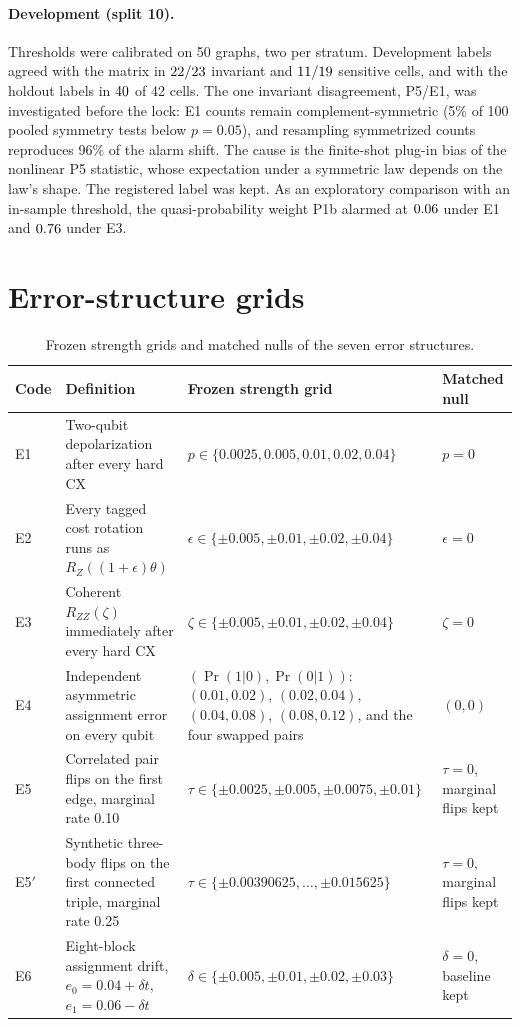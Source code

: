 \documentclass[10pt,twocolumn]{article}
\begin{document}
\paragraph{Development (split 10).} Thresholds were calibrated on 50 graphs,
two per stratum. Development labels agreed with the matrix in
$22/23$ invariant and $11/19$ sensitive cells, and with the
holdout labels in $40$ of 42 cells. The one invariant
disagreement, P5/E1, was investigated before the lock: E1 counts remain
complement-symmetric (5\% of 100 pooled symmetry tests below $p=0.05$), and
resampling symmetrized counts reproduces 96\% of the alarm shift. The cause is
the finite-shot plug-in bias of the nonlinear P5 statistic, whose expectation
under a symmetric law depends on the law's shape. The registered label was
kept. As an exploratory comparison with an in-sample threshold, the
quasi-probability weight P1b alarmed at $0.06$ under E1 and
$0.76$ under E3.

\section{Error-structure grids}

\begin{table}[h]
\centering
\caption{Frozen strength grids and matched nulls of the seven error structures.}
\label{tab:grids}
\small
\begin{tabularx}{\textwidth}{@{}lXXl@{}}
\toprule
Code & Definition & Frozen strength grid & Matched null \\
\midrule
E1 & Two-qubit depolarization after every hard CX & $p\in\{0.0025,0.005,0.01,0.02,0.04\}$ & $p=0$ \\
E2 & Every tagged cost rotation runs as $R_Z((1+\epsilon)\theta)$ & $\epsilon\in\{\pm0.005,\pm0.01,\pm0.02,\pm0.04\}$ & $\epsilon=0$ \\
E3 & Coherent $R_{ZZ}(\zeta)$ immediately after every hard CX & $\zeta\in\{\pm0.005,\pm0.01,\pm0.02,\pm0.04\}$ & $\zeta=0$ \\
E4 & Independent asymmetric assignment error on every qubit & $(\Pr(1|0),\Pr(0|1))$: $(0.01,0.02)$, $(0.02,0.04)$, $(0.04,0.08)$, $(0.08,0.12)$, and the four swapped pairs & $(0,0)$ \\
E5 & Correlated pair flips on the first edge, marginal rate 0.10 & $\tau\in\{\pm0.0025,\pm0.005,\pm0.0075,\pm0.01\}$ & $\tau=0$, marginal flips kept \\
E5$'$ & Synthetic three-body flips on the first connected triple, marginal rate 0.25 & $\tau\in\{\pm0.00390625,\ldots,\pm0.015625\}$ & $\tau=0$, marginal flips kept \\
E6 & Eight-block assignment drift, $e_0=0.04+\delta t$, $e_1=0.06-\delta t$ & $\delta\in\{\pm0.005,\pm0.01,\pm0.02,\pm0.03\}$ & $\delta=0$, baseline kept \\
\bottomrule
\end{tabularx}
\end{table}
\end{document}
